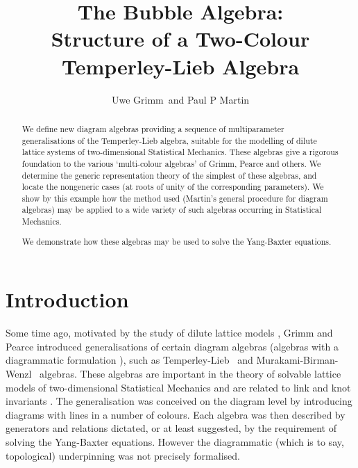 \documentclass[12pt]{iopart}
\newcommand{\TL}{Temperley-Lieb}
\newcommand{\BMW}{Murakami-Birman-Wenzl}
\begin{document}

\title[The Bubble Algebra]{The Bubble Algebra:\\
 Structure of a Two-Colour Temperley-Lieb Algebra}

\author{Uwe Grimm\dag\ and Paul P Martin\ddag}

\address{\dag\ Applied Mathematics Department, The Open University,
Walton Hall, Milton Keynes MK7 6AA, UK}

\address{\ddag\ Mathematics Department, City University, 
Northampton Square, London EC1V 0HB, UK}

\setcounter{footnote}{2}

\begin{abstract}
We define new diagram algebras providing a sequence of multiparameter
generalisations of the Temperley-Lieb algebra, suitable for the
modelling of dilute lattice systems of two-dimensional Statistical
Mechanics.  These algebras give a rigorous foundation to the various
`multi-colour algebras' of Grimm, Pearce and others.  We determine
the generic representation theory of the simplest of these algebras,
and locate the nongeneric cases (at roots of unity of the
corresponding parameters).  We show by this example how the method
used (Martin's general procedure for diagram algebras) may be applied
to a wide variety of such algebras occurring in Statistical Mechanics.

We demonstrate how these algebras may be used to solve the
Yang-Baxter equations.
\end{abstract}



\section{Introduction}
\setcounter{paragraph}{0}

Some time ago, motivated by the study of dilute lattice models
\cite{R92,WNS92}, Grimm and Pearce \cite{GP93} introduced
generalisations of certain diagram algebras (algebras with a
diagrammatic formulation \cite{M91}), such as \TL\ \cite{TL71} and
\BMW\ \cite{M87,BW89} algebras.  These algebras are important in the
theory of solvable lattice models of two-dimensional Statistical
Mechanics \cite{Baxter} and are related to link and knot invariants
\cite{WDA89}. The generalisation was conceived on the diagram level by
introducing diagrams with lines in a number of colours.  Each algebra
was then described by generators and relations dictated, or at least
suggested, by the requirement of solving the Yang-Baxter equations.
However the diagrammatic (which is to say, topological) underpinning
was not precisely formalised.
\end{document}

